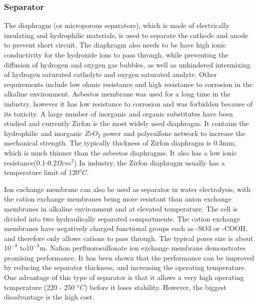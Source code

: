 \documentclass[11pt, a4paper]{article}
\begin{document}
\subsubsection{Separator} 
The diaphragm (or microporous separators), which is made of electrically insulating and hydrophilic materials, is used to separate the cathode and anode to prevent short circuit. The diaphragm also needs to be have high ionic conductivity for the hydroxide ions to pass through, while preventing the diffusion of hydrogen and oxygen gas bubbles, as well as unhindered intermixing of hydrogen saturated catholyte and oxygen saturated anolyte. Other requirements include low ohmic resistance and high resistance to corrosion in the alkaline environment. Asbestos membrane was used for a long time in the industry, however it has low resistance to corrosion and was forbidden because of its toxicity. A large number of inorganic and organic substitutes have been studied and currently Zirfon is the most widely used diaphragm. It contains the hydrophilic and inorganic $ZrO_2$ power and polysulfone network to increase the mechanical strength. The typically thickness of Zirfon diaphragm is 0.3mm, which is much thinner than the asbestos diaphragms. It also has a low ionic resistance(0.1-0.2$\Omega cm^2$)\cite{zirfon} In industry, the Zirfon diaphragm usually has a temperature limit of $120^oC$.\cite{pressure}


Ion exchange membrane can also be used as separator in water electrolysis, with the cation exchange membranes being more resistant than anion exchange membranes in alkaline environment and at elevated temperature. The cell is divided into two hydraulically separated compartments. The cation exchange membranes have negatively charged functional groups such as -SO3 or -COOH, and therefore only allows cations to pass through. \cite{ionexchange} The typical pores size is about $10^{-9}$ to1$ 0^{-8}$m.\cite{separator} Nafion perfluorosulfonate ion exchange membrane demonstrates promising performance. It has been shown that the performance can be improved by reducing the separator thickness, and increasing the operating temperature. One advantage of this type of separator is that it allows a very high operating temperature (220 - 250 $^oC$) before it loses stability.\cite{separator3} However, the biggest disadvantage is the high cost.\cite{separator2} 
\end{document}
